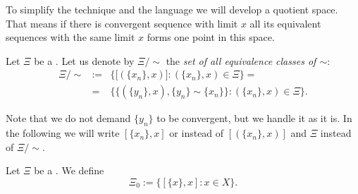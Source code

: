 To simplify the technique and the language we will develop a quotient space. That means if there is convergent sequence with limit $x$ all its equivalent sequences with the same limit $x$ forms one point in this space. 

\begin{define}\label{def:quosp}
Let $\Xi$ be a \fcs. Let us denote by $\Xi/\!\sim$ the \emph{set of all equivalence classes of $\sim$}:
\begin{eqnarray}
	\Xi/\!\sim & := & \bigg\{\Big[(\{x_n\},x)\Big] : (\{x_n\},x)\in\Xi \bigg\} = \nonumber\\
	& {}= & \bigg\{\Big\{(\{y_n\},x), \{y_n\} \sim \{x_n\}\Big\} : (\{x_n\},x)\in\Xi \bigg\}.\nonumber
\end{eqnarray}
\end{define}

Note that we do not demand $ \{y_n\}$ to be convergent, but we handle it as it is. In the following we will write $[\{x_n\},x]$ or instead of $[(\{x_n\},x)]$ and $\Xi$ instead of $\Xi/\!\sim$.


\begin{define}\label{def:xi0}
Let $\Xi$ be a \fcs. We define
\[
	\Xi_0:=\bigg\{[\{x\},x] : x\in X\bigg\}.
\]
\end{define}